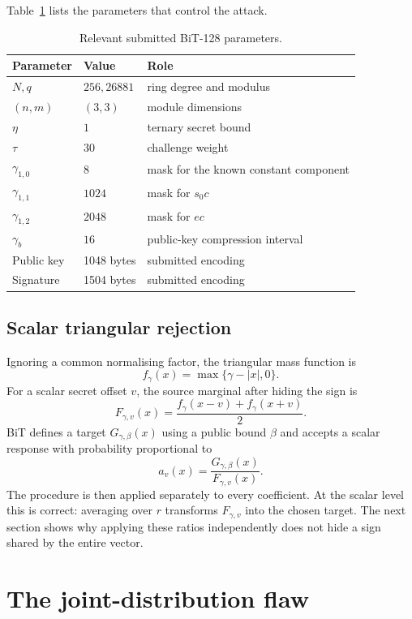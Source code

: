 \documentclass[11pt,a4paper]{article}
\begin{document}
Table~\ref{tab:params} lists the parameters that control the attack.

\begin{table}[ht]
\centering
\caption{Relevant submitted BiT-128 parameters.}
\label{tab:params}
\begin{tabular}{@{}lll@{}}
\toprule
Parameter & Value & Role \\
\midrule
$N,q$ & $256,26881$ & ring degree and modulus \\
$(n,m)$ & $(3,3)$ & module dimensions \\
$\eta$ & $1$ & ternary secret bound \\
$\tau$ & $30$ & challenge weight \\
$\gamma_{1,0}$ & $8$ & mask for the known constant component \\
$\gamma_{1,1}$ & $1024$ & mask for $s_0c$ \\
$\gamma_{1,2}$ & $2048$ & mask for $ec$ \\
$\gamma_b$ & $16$ & public-key compression interval \\
Public key & 1048 bytes & submitted encoding \\
Signature & 1504 bytes & submitted encoding \\
\bottomrule
\end{tabular}
\end{table}

\subsection{Scalar triangular rejection}

Ignoring a common normalising factor, the triangular mass function is
\[
 f_\gamma(x)=\max\{\gamma-|x|,0\}.
\]
For a scalar secret offset $v$, the source marginal after hiding the sign is
\[
 F_{\gamma,v}(x)=\frac{f_\gamma(x-v)+f_\gamma(x+v)}{2}.
\]
BiT defines a target $G_{\gamma,\beta}(x)$ using a public bound $\beta$ and
accepts a scalar response with probability proportional to
\[
                a_v(x)=\frac{G_{\gamma,\beta}(x)}
                              {F_{\gamma,v}(x)}.
\]
The procedure is then applied separately to every coefficient.  At the scalar
level this is correct: averaging over $r$ transforms $F_{\gamma,v}$ into the
chosen target.  The next section shows why applying these ratios independently
does not hide a sign shared by the entire vector.

\section{The joint-distribution flaw}
\end{document}
